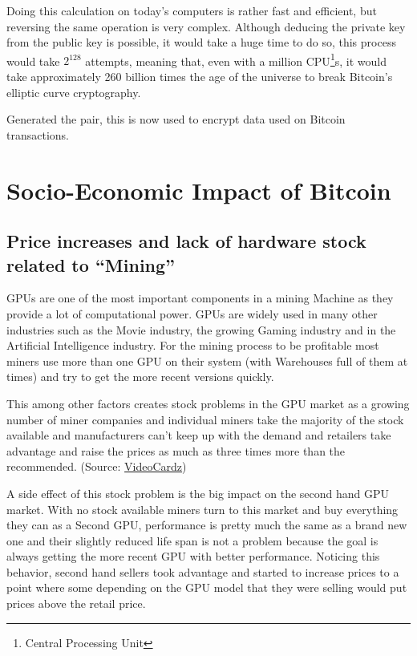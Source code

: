 \documentclass{article}
\newcommand\tab[1][1cm]{\hspace*{#1}}
\begin{document}
Doing this calculation on today's computers is rather fast and efficient, but reversing the same operation is very complex. Although deducing the private key from the public key is possible, it would take a huge time to do so, this process would take \(2^{128}\) attempts, meaning that, even with a million CPU\footnote{Central Processing Unit}s, it would take approximately 260 billion times the age of the universe to break Bitcoin's elliptic curve cryptography.

Generated the pair, this is now used to encrypt data used on Bitcoin transactions.

\section{Socio-Economic Impact of Bitcoin}

\subsection{Price increases and lack of hardware stock related to “Mining”}

\tab GPUs are one of the most important components in a mining Machine as they provide a lot of computational power. GPUs are widely used in many other industries such as the Movie industry, the growing Gaming industry and in the Artificial Intelligence industry. For the mining process to be profitable most miners use more than one GPU on their system (with Warehouses full of them at times) and try to get the more recent versions quickly.

This among other factors creates stock problems in the GPU market as a growing number of miner companies and individual miners take the majority of the stock available and manufacturers can’t keep up with the demand and retailers take advantage and raise the prices as much as three times more than the recommended. (Source: \href{https://videocardz.com/newz/nvidia-geforce-rtx-30-graphics-card-cost-3-times-more-than-nvidia-msrp-in-europe}{VideoCardz})

A side effect of this stock problem is the big impact on the second hand GPU market. With no stock available miners turn to this market and buy everything they can as a Second GPU, performance is  pretty much the same as a brand new one and their slightly reduced life span is not a problem because the goal is always getting the more recent GPU with better performance. Noticing this behavior, second hand sellers took advantage and started to increase prices to a point where some depending on the GPU model that they were selling  would put prices above the retail price.
\end{document}
